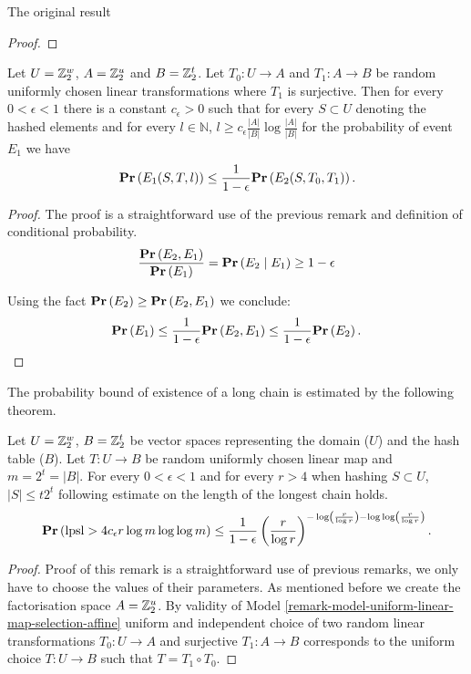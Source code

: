 \begin{section}{The original result}
\begin{proof}
\end{proof}

\begin{corollary}
\label{corollary-prob-e2-e1}
Let $U = \mathbb{Z}_{2}^{w}$, $A = \mathbb{Z}_{2}^{u}$ and $B = \mathbb{Z}_{2}^{t}$. Let $T_0: U \rightarrow A$ and $T_1: A \rightarrow B$ be random uniformly chosen linear transformations where $T_1$ is surjective. Then for every $0 < \epsilon < 1$ there is a constant $c_{\epsilon} > 0$ such that for every $S \subset U$ denoting the hashed  elements and for every $l \in \mathbb{N}$, $l \geq c_{\epsilon}{\frac{|A|}{|B|}}\log\frac{|A|}{|B|}$ for the probability of event $E_1$ we have
\[
	\mathbf{Pr}\left(E_1(S, T, l)\right) \leq \frac{1}{1 - \epsilon} \mathbf{Pr}\left(E_2(S, T_0, T_1)\right) \text{.}
\]
\end{corollary}
\begin{proof}
The proof is a straightforward use of the previous remark and definition of conditional probability.
\[
	\frac{\mathbf{Pr}\left(E_2, E_1\right)}{\mathbf{Pr}\left(E_1\right)} = \mathbf{Pr}\left(E_2 \mid E_1\right) \geq 1 - \epsilon
\]

Using the fact $\mathbf{Pr}\left(E_2\right) \geq \mathbf{Pr}\left(E_2, E_1\right)$ we conclude:
\[
	\mathbf{Pr}\left(E_1\right) \leq \frac{1}{1 - \epsilon}\mathbf{Pr}\left(E_2, E_1\right) \leq \frac{1}{1 - \epsilon}\mathbf{Pr}\left(E_2\right) \text{.}
\]
\end{proof}

The probability bound of existence of a long chain is estimated by the following theorem.
\begin{remark}
\label{remark-probability-long-chain}
Let $U = \mathbb{Z}_{2}^{w}$, $B = \mathbb{Z}_{2}^{t}$ be vector spaces representing the domain ($U$) and the hash table ($B$). Let $T: U \rightarrow B$ be random uniformly chosen linear map and $m = 2 ^ t = |B|$. For every $0 < \epsilon < 1$ and for every $r > 4$ when hashing $S \subset U$, $|S| \leq t 2 ^ t$ following estimate on the length of the longest chain holds.
\[
	\mathbf{Pr}\left(\mathrm{lpsl} > 4 c_\epsilon r \log m \log \log m\right) \leq \frac{1}{1 - \epsilon} \left(\frac{r}{\log r}\right)^{-\log \left(\frac{r}{\log r}\right) - \log \log \left(\frac{r}{\log r}\right)} \text{.}
\]
\end{remark}
\begin{proof}
Proof of this remark is a straightforward use of previous remarks, we only have to choose the values of their parameters. As mentioned before we create the factorisation space $A = \mathbb{Z}_{2}^{u}$. By validity of Model \ref{remark-model-uniform-linear-map-selection-affine} uniform and independent choice of two random linear transformations $T_0: U \rightarrow A$ and surjective $T_1: A \rightarrow B$ corresponds to the uniform choice $T: U \rightarrow B$ such that $T = T_1 \circ T_0$.


\end{proof}
\end{section}
